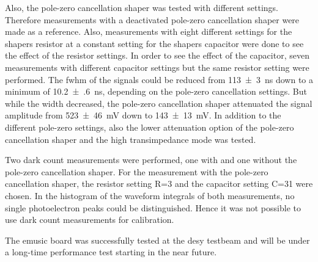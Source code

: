 Also, the pole-zero cancellation shaper was tested with different settings.
Therefore measurements with a deactivated pole-zero cancellation shaper were made as a reference.
Also, measurements with eight different settings for the shapers resistor at a constant setting for the shapers capacitor were done to see the effect of the resistor settings.
In order to see the effect of the capacitor, seven measurements with different capacitor settings but the same resistor setting were performed.
The \ac{fwhm} of the signals could be reduced from \SI{113(3)}{\nano\second} down to a minimum of \SI{10.2(6)}{\nano\second}, depending on the pole-zero cancellation settings.
But while the width decreased, the pole-zero cancellation shaper attenuated the signal amplitude from \SI{523(46)}{\milli\volt} down to \SI{143(13)}{\milli\volt}.
In addition to the different pole-zero settings, also the lower attenuation option of the pole-zero cancellation shaper and the high transimpedance mode was tested.

Two dark count measurements were performed, one with and one without the pole-zero cancellation shaper.
For the measurement with the pole-zero cancellation shaper, the resistor setting R=3 and the capacitor setting C=31 were chosen.
In the histogram of the waveform integrals of both measurements, no single photoelectron peaks could be distinguished.
Hence it was not possible to use dark count measurements for calibration.

The \ac{emusic} board was successfully tested at the \ac{desy} testbeam and will be under a long-time performance test starting in the near future.
